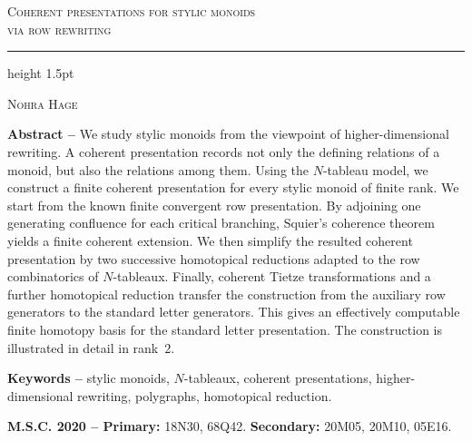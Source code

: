 \documentclass[a4paper, twoside, 11pt, english]{article}
\begin{document}
\thispagestyle{empty}

\begin{center}

\begin{doublespace}
\begin{huge}
{\scshape Coherent presentations for stylic monoids \\ via row rewriting}
\end{huge}

\bigskip
\hrule height 1.5pt
\bigskip

\begin{Large}
{\scshape Nohra Hage}
\end{Large}

\vspace{0.5cm}
\end{doublespace}

\vspace{1cm}

\begin{small}
\begin{minipage}{14cm}
\noindent\textbf{Abstract -- }
We study stylic monoids from the viewpoint of higher-dimensional rewriting. A coherent presentation records not only the defining relations of a monoid, but also the relations among them. Using the $N$-tableau model, we construct a finite coherent presentation for every stylic monoid of finite rank. We start from the known finite convergent row presentation. By adjoining one generating confluence for each critical branching,
Squier's coherence theorem yields a finite coherent extension. We then simplify the resulted coherent presentation by two successive homotopical reductions adapted to the row combinatorics of $N$-tableaux. Finally, coherent Tietze transformations and a further homotopical reduction transfer the construction from the auxiliary row generators to the standard letter generators. This gives an effectively computable finite homotopy basis for the standard letter presentation. The construction is illustrated in detail in rank~$2$.



\medskip

\smallskip
\noindent\textbf{Keywords --}
stylic monoids, $N$-tableaux, coherent presentations, higher-dimensional rewriting, polygraphs, homotopical reduction.

\medskip

\smallskip
\noindent\textbf{M.S.C. 2020 -- Primary:}
18N30, 68Q42.
\textbf{Secondary:}
20M05, 20M10, 05E16.
\end{minipage}
\end{small}

\begin{small}\begin{minipage}{12cm}
\renewcommand{\contentsname}{}
\setcounter{tocdepth}{1}
\tableofcontents
\end{minipage}
\end{small}
\end{center}
\end{document}
